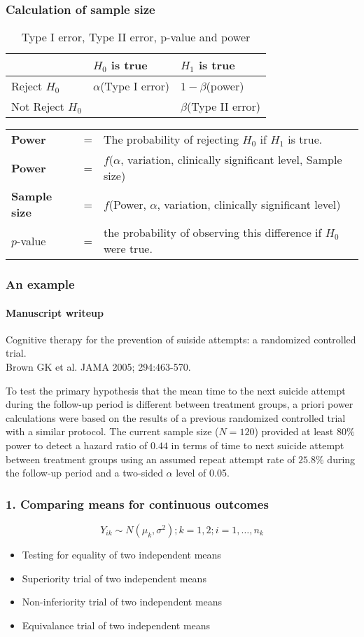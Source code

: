 \documentclass[table,10pt]{beamer}
\begin{document}
\begin{CJK*}{UTF8}{gbsn}
\begin{frame}[t]
\frametitle{Calculation of sample size}
\begin{table}
\caption{Type I error, Type II error, p-value and power}
\begin{tabular}{lll}
& $H_0$ is true & $H_1$ is true\\
\hline
Reject $H_0$ & $\alpha$(Type I error) & $1-\beta$(power)\\
Not Reject $H_0$ & & $\beta$(Type II error)\\
\hline 
\end{tabular}
\end{table}
\begin{table}
\begin{tabular}{lcl}
\textbf{Power} & = & The probability of rejecting $H_0$ if $H_1$ is true.\\
\textbf{Power} & = & $f$($\alpha$, variation, clinically significant level, \alert{Sample size})\\
\textbf{Sample size} & = & $f$(\alert{Power}, $\alpha$, variation, clinically significant level)\\
$p$-value & = & the probability of observing this difference if $H_0$ were true.
\end{tabular}
\end{table}
\end{frame}


\begin{frame}[t]
\frametitle{An example}
\framesubtitle{Manuscript writeup}
\alert{\Large Cognitive therapy for the prevention of suiside attempts: a randomized controlled trial.}\\
{\small Brown GK et al. JAMA 2005; 294:463-570.}

To test the primary hypothesis that the mean time to the next suicide 
attempt during the follow-up period is different between treatment 
groups, a priori power calculations were based on the results of a 
previous randomized controlled trial with a similar protocol. The current sample size ($N = 120$) provided at least $80\%$ power to 
detect a hazard ratio of $0.44$ in terms of time to next suicide 
attempt between treatment groups using an assumed repeat attempt rate 
of $25.8\%$ during the follow-up period and a two-sided $\alpha$ level of 0.05.
\end{frame}

\begin{frame}[t]
\frametitle{1. Comparing means for continuous outcomes}
$$
Y_{ik} \sim N(\mu_k, \sigma^2); k=1,2; i=1,\dots,n_k
$$
\begin{itemize}
	\item Testing for equality of two independent means
	\item Superiority trial of two independent means
	\item Non-inferiority trial of two independent means
	\item Equivalance trial of two independent means
\end{itemize}
\end{frame}


\end{CJK*}
\end{document}
